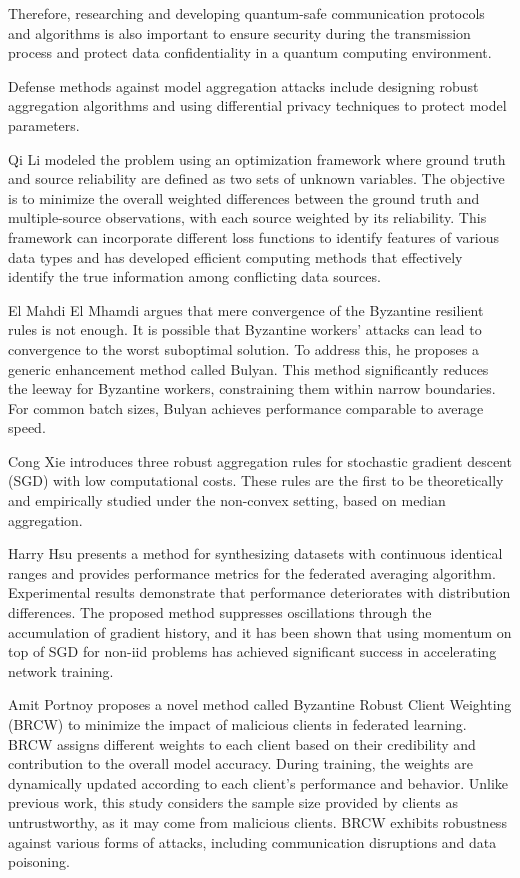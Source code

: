 \documentclass[conference]{IEEEtran}
\begin{document}
Therefore, researching and developing quantum-safe communication protocols and algorithms is also 
important to ensure security during the transmission process and protect data confidentiality in a 
quantum computing environment.

Defense methods against model aggregation attacks include designing robust aggregation 
algorithms and using differential privacy techniques to protect model parameters.


Qi Li \cite{b122} modeled the problem using an optimization framework where ground 
truth and source reliability are defined as two sets of unknown variables. The objective 
is to minimize the overall weighted differences between the ground truth and multiple-source 
observations, with each source weighted by its reliability. This framework can incorporate 
different loss functions to identify features of various data types and has developed efficient 
computing methods that effectively identify the true information among conflicting data sources.


El Mahdi El Mhamdi \cite{b120} argues that mere convergence of the Byzantine resilient 
rules is not enough. It is possible that Byzantine workers' attacks can lead to convergence 
to the worst suboptimal solution. To address this, he proposes a generic enhancement method 
called Bulyan. This method significantly reduces the leeway for Byzantine workers, constraining 
them within narrow boundaries. For common batch sizes, Bulyan achieves performance comparable to 
average speed.

Cong Xie \cite{b121} introduces three robust aggregation rules for stochastic gradient 
descent (SGD) with low computational costs. These rules are the first to be theoretically 
and empirically studied under the non-convex setting, based on median aggregation.

Harry Hsu \cite{b123} presents a method for synthesizing datasets with continuous identical 
ranges and provides performance metrics for the federated averaging algorithm. Experimental 
results demonstrate that performance deteriorates with distribution differences. The proposed 
method suppresses oscillations through the accumulation of gradient history, and it has been 
shown that using momentum on top of SGD for non-iid problems has achieved significant success 
in accelerating network training.


Amit Portnoy \cite{b133} proposes a novel method called Byzantine Robust Client Weighting (BRCW) to 
minimize the impact of malicious clients in federated learning. BRCW assigns different weights to 
each client based on their credibility and contribution to the overall model accuracy. 
During training, the weights are dynamically updated according to each client's performance 
and behavior. Unlike previous work, this study considers the sample size provided by clients 
as untrustworthy, as it may come from malicious clients. BRCW exhibits robustness against various 
forms of attacks, including communication disruptions and data poisoning.
\end{document}
